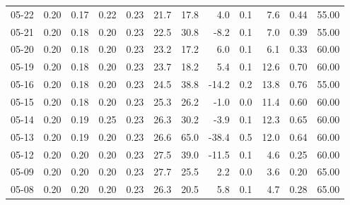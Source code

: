 \begin{threeparttable}
{\begin{tabular}{lrrrrrrrrrrr}
  05-22 &          0.20 &          0.17 &          0.22 &        0.23 &                21.7 &                17.8 &        4.0 &                 0.1 &              7.6 &            0.44 &                  55.00 \\
  05-21 &          0.20 &          0.18 &          0.20 &        0.23 &                22.5 &                30.8 &       -8.2 &                 0.1 &              7.0 &            0.39 &                  55.00 \\
  05-20 &          0.20 &          0.18 &          0.20 &        0.23 &                23.2 &                17.2 &        6.0 &                 0.1 &              6.1 &            0.33 &                  60.00 \\
  05-19 &          0.20 &          0.18 &          0.20 &        0.23 &                23.7 &                18.2 &        5.4 &                 0.1 &             12.6 &            0.70 &                  60.00 \\
  05-16 &          0.20 &          0.18 &          0.20 &        0.23 &                24.5 &                38.8 &      -14.2 &                 0.2 &             13.8 &            0.76 &                  55.00 \\
  05-15 &          0.20 &          0.18 &          0.20 &        0.23 &                25.3 &                26.2 &       -1.0 &                 0.0 &             11.4 &            0.60 &                  60.00 \\
  05-14 &          0.20 &          0.19 &          0.25 &        0.23 &                26.3 &                30.2 &       -3.9 &                 0.1 &             12.3 &            0.65 &                  60.00 \\
  05-13 &          0.20 &          0.19 &          0.20 &        0.23 &                26.6 &                65.0 &      -38.4 &                 0.5 &             12.0 &            0.64 &                  60.00 \\
  05-12 &          0.20 &          0.20 &          0.20 &        0.23 &                27.5 &                39.0 &      -11.5 &                 0.1 &              4.6 &            0.25 &                  60.00 \\
  05-09 &          0.20 &          0.20 &          0.20 &        0.23 &                27.7 &                25.5 &        2.2 &                 0.0 &              3.6 &            0.20 &                  65.00 \\
  05-08 &          0.20 &          0.20 &          0.20 &        0.23 &                26.3 &                20.5 &        5.8 &                 0.1 &              4.7 &            0.28 &                  65.00 \\

\end{tabular}}
\end{threeparttable}
